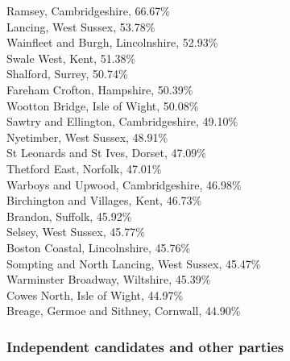 \documentclass[a4paper,openany,10pt]{book}
\begin{document}
Ramsey, Cambridgeshire, 66.67\%\\
Lancing, West Sussex, 53.78\%\\
Wainfleet and Burgh, Lincolnshire, 52.93\%\\
Swale West, Kent, 51.38\%\\
Shalford, Surrey, 50.74\%\\
Fareham Crofton, Hampshire, 50.39\%\\
Wootton Bridge, Isle of Wight, 50.08\%\\
Sawtry and Ellington, Cambridgeshire, 49.10\%\\
Nyetimber, West Sussex, 48.91\%\\
St Leonards and St Ives, Dorset, 47.09\%\\
Thetford East, Norfolk, 47.01\%\\
Warboys and Upwood, Cambridgeshire, 46.98\%\\
Birchington and Villages, Kent, 46.73\%\\
Brandon, Suffolk, 45.92\%\\
Selsey, West Sussex, 45.77\%\\
Boston Coastal, Lincolnshire, 45.76\%\\
Sompting and North Lancing, West Sussex, 45.47\%\\
Warminster Broadway, Wiltshire, 45.39\%\\
Cowes North, Isle of Wight, 44.97\%\\
Breage, Germoe and Sithney, Cornwall, 44.90\%\\

\subsubsection*{Independent candidates and other parties}
\end{document}
